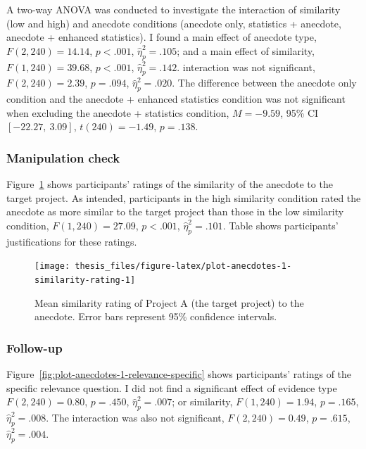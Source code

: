 \documentclass[a4paper, nobind, dvipsnames]{templates/ociamthesis}
\theoremstyle{definition}
\theoremstyle{definition}
\theoremstyle{definition}
\theoremstyle{definition}
\theoremstyle{remark}
\begin{document}
A two-way ANOVA was conducted to investigate the interaction of similarity (low
and high) and anecdote conditions (anecdote only, statistics + anecdote,
anecdote + enhanced statistics). I found a main effect of anecdote type,
\(F(2, 240) = 14.14\), \(p < .001\), \(\hat{\eta}^2_p = .105\); and a main effect of similarity,
\(F(1, 240) = 39.68\), \(p < .001\), \(\hat{\eta}^2_p = .142\). interaction was not significant,
\(F(2, 240) = 2.39\), \(p = .094\), \(\hat{\eta}^2_p = .020\). The difference between
the anecdote only condition and the anecdote + enhanced statistics condition was
not significant when excluding the anecdote + statistics condition,
\(M = -9.59\), 95\% CI \([-22.27,~3.09]\), \(t(240) = -1.49\), \(p = .138\).

\subsubsection{Manipulation check}

Figure~\ref{fig:plot-anecdotes-1-similarity-rating} shows participants' ratings
of the similarity of the anecdote to the target project. As intended,
participants in the high similarity condition rated the anecdote as more similar
to the target project than those in the low similarity condition,
\(F(1, 240) = 27.09\), \(p < .001\), \(\hat{\eta}^2_p = .101\). Table shows participants'
justifications for these ratings.



\begin{figure}
\texttt{[image: thesis\_files/figure-latex/plot-anecdotes-1-similarity-rating-1]} \caption{Mean similarity rating of Project A (the target project) to the anecdote. Error bars represent 95\% confidence intervals.}\label{fig:plot-anecdotes-1-similarity-rating}
\end{figure}

\subsubsection{Follow-up}

Figure~\ref{fig:plot-anecdotes-1-relevance-specific} shows participants' ratings
of the specific relevance question. I did not find a significant effect of
evidence type \(F(2, 240) = 0.80\), \(p = .450\), \(\hat{\eta}^2_p = .007\); or
similarity, \(F(1, 240) = 1.94\), \(p = .165\), \(\hat{\eta}^2_p = .008\). The
interaction was also not significant,
\(F(2, 240) = 0.49\), \(p = .615\), \(\hat{\eta}^2_p = .004\).
\end{document}
